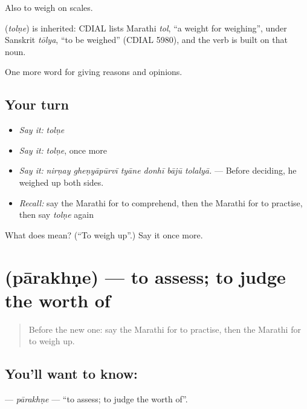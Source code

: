 Also to weigh on scales.

\begin{cousinweb}
\textbf{} (\emph{tolṇe}) is inherited: CDIAL lists Marathi \emph{tol}, \textquotedblleft{}a weight for weighing\textquotedblright{}, under Sanskrit \emph{tōlya}, \textquotedblleft{}to be weighed\textquotedblright{} (CDIAL 5980), and the verb is built on that noun.
\end{cousinweb}

\begin{grammarlens}[title={What you've built}]
One more word for giving reasons and opinions.
\end{grammarlens}

\subsection*{Your turn}
\begin{itemize}
\raggedright
  \item \emph{Say it:} \emph{tolṇe}
  \item \emph{Say it:} \emph{tolṇe}, once more
  \item \emph{Say it:} \emph{nirṇay gheṇyāpūrvī tyāne donhī bājū tolalyā.} — Before deciding, he weighed up both sides.
  \item \emph{Recall:} say the Marathi for to comprehend, then the Marathi for to practise, then say \emph{tolṇe} again
\end{itemize}

\begin{tcolorbox}[breakable,colback=teal!4,colframe=teal!35!black,title={Before you move on}]
What does  mean? (\textquotedblleft{}To weigh up\textquotedblright{}.) Say it once more.
\end{tcolorbox}
\section[\texorpdfstring{\mr{पारखणे} (pārakhṇe)}{पारखणे (pārakhṇe)}]{ (pārakhṇe) — to assess; to judge the worth of}

\label{lesson:MR-C376-parakhne}



\begin{quote}
Before the new one: say the Marathi for to practise, then the Marathi for to weigh up.
\end{quote}

\subsection*{You'll want to know: }
\textbf{} — \emph{pārakhṇe} — \textquotedblleft{}to assess; to judge the worth of\textquotedblright{}.

